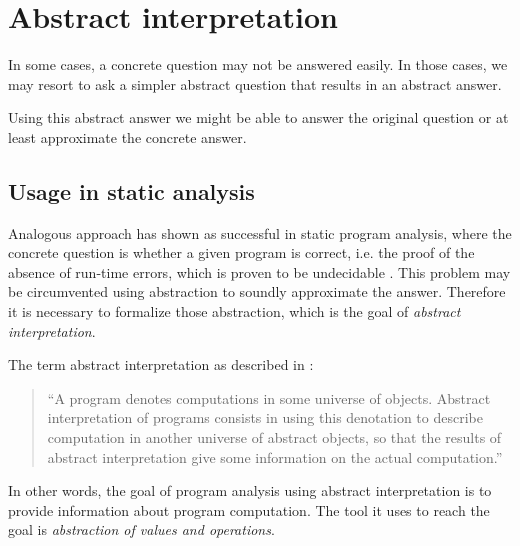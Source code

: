\documentclass[12pt,oneside]{fithesis2}
\theoremstyle{definition}
\begin{document}
\chapter{Abstract interpretation}\label{ch:abstract-interpretation}

In some cases, a concrete question may not be answered easily. In those cases, we may resort to ask a simpler abstract question that results in an abstract answer.

Using this abstract answer we might be able to answer the original question or at least approximate the concrete answer. \cite{CousotCousot04-WCC}

\section{Usage in static analysis}

Analogous approach has shown as successful in static program analysis, where the concrete question is whether a given program is correct, i.e. the proof of the absence of run-time errors, which is proven to be undecidable \cite{mine-AIAA10}. This problem may be circumvented using abstraction to soundly approximate the answer. Therefore it is necessary to formalize those abstraction, which is the goal of \textit{abstract interpretation}.

The term abstract interpretation as described in \cite{CousotCousot77-1}:

\begin{quotation}
``A program denotes computations in some universe of objects. Abstract interpretation of programs consists in using this denotation to describe computation in another universe of abstract objects, so that the results of abstract interpretation give some information on the actual computation.''
\end{quotation}

In other words, the goal of program analysis using abstract interpretation is to provide information about program computation. The tool it uses to reach the goal is \textit{abstraction of values and operations}.
\end{document}
